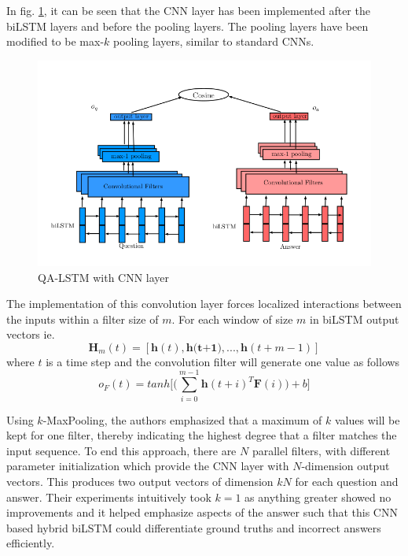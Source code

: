 \documentclass[a4paper,12pt]{report}
\begin{document}
            In fig. \ref{lstmhaigcnn}, it can be seen that the CNN layer has been implemented after the biLSTM layers and before the pooling layers. The pooling layers have been modified to be max-$ k $ pooling layers, similar to standard CNNs.
            \begin{figure}
                \centering
                \includegraphics[scale=0.35]{../images/lstm-bilstmhaigcnn.png}
                \caption{QA-LSTM with CNN layer \citep{lstmhaighextractive}}\label{lstmhaigcnn}
            \end{figure}

            The implementation of this convolution layer forces localized interactions between the inputs within a filter size of $ m $. For each window of size $ m $ in biLSTM output vectors ie.
            \begin{equation}
            \textbf{H}_{m}(t)=[\textbf{h}(t), \textbf{h(t+1)},...,\textbf{h}(t+m-1)]
            \end{equation}
            where $ t $ is a time step and the convolution filter will generate one value as follows
            \begin{equation}
                o_{F}(t) = tanh \bigg[\bigg(\sum_{i=0}^{m-1}\textbf{h}(t+i)^{T}\textbf{F}(i)\bigg)+b\bigg]
            \end{equation}

            Using $ k $-MaxPooling, the authors emphasized that a maximum of $ k $ values will be kept  for one filter, thereby indicating the highest degree that a filter matches the input sequence. To end this approach, there are $ N $ parallel filters, with different parameter initialization which provide the CNN layer with $ N $-dimension output vectors. This produces two output vectors of dimension $ kN $ for each question and answer.  Their experiments intuitively took $k=1$ as anything greater showed no improvements and it helped emphasize aspects of the answer such that this CNN based hybrid biLSTM could differentiate ground truths and incorrect answers efficiently.
\end{document}
